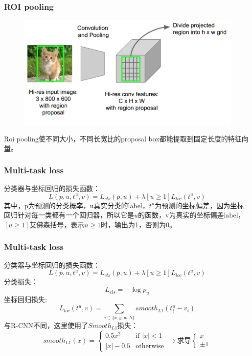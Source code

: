 \documentclass{beamer}
\begin{document}
\begin{frame}
    \frametitle{ROI pooling}
    \begin{figure}
        \centering
        \includegraphics[width=1.0\textwidth]{graphic/roipooling6.png}
    \end{figure}
    Roi pooling使不同大小，不同长宽比的proposal box都能提取到固定长度的特征向量。
\end{frame}


\begin{frame}
    \frametitle{Multi-task loss}
    分类器与坐标回归的损失函数：
    $$L(p,u,t^u,v)=L_{cls}(p,u) + \lambda [u\geqslant 1]L_{loc}(t^u,v)$$
    其中，p为预测的分类概率，u真实分类的label，$t^u$为预测的坐标偏差，因为坐标回归针对每一类都有一个回归器，所以它是$u$的函数，v为真实的坐标偏差label，$[u\geqslant 1]$艾佛森括号，表示$u\geqslant 1$时，输出为1，否则为0。
\end{frame}

\begin{frame}
    \frametitle{Multi-task loss}
    分类器与坐标回归的损失函数：
    $$L(p,u,t^u,v)=L_{cls}(p,u) + \lambda [u\geqslant 1]L_{loc}(t^u,v)$$
    分类损失：
    $$L_{cls}=-\log p_u$$
    坐标回归损失:
    $$L_{loc}(t^u,v)=\sum_{i\in \{x,y,w,h\}}smooth_{L1}(t^u_i-v_i)$$
    与R-CNN不同，这里使用了$Smooth_{L1}$损失：
    $$smooth_{L1}(x) = \begin{cases} 
        0.5x^2 &\text{if }|x| < 1 \\
        |x| - 0.5 &\text{otherwise}\end{cases}  \rightarrow \text{求导}
    \begin{cases} x \\ \pm 1 \end{cases}$$
\end{frame}
\end{document}
